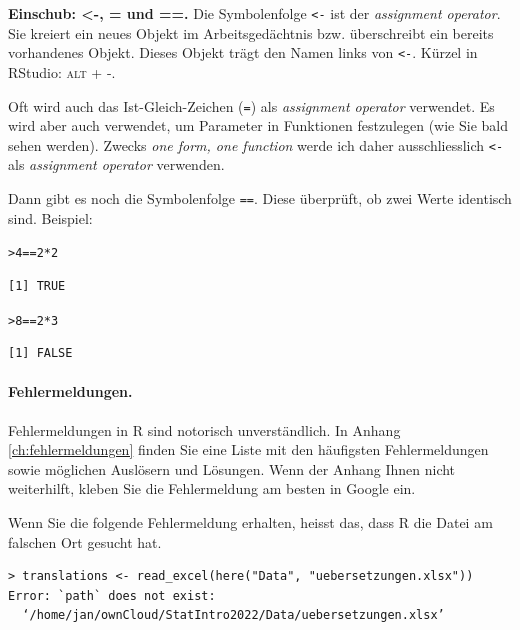 \documentclass[oneside, 10pt]{book}\usepackage[]{graphicx}\usepackage[]{xcolor}
\makeatletter
\newcommand{\hlnum}[1]{\textcolor[rgb]{0.686,0.059,0.569}{#1}}%
\newcommand{\hlopt}[1]{\textcolor[rgb]{0,0,0}{#1}}%
\newcommand{\hlstd}[1]{\textcolor[rgb]{0.345,0.345,0.345}{#1}}%
\newenvironment{kframe}{%
 \def\at@end@of@kframe{}%
 \ifinner\ifhmode%
  \def\at@end@of@kframe{\end{minipage}}%
  \begin{minipage}{\columnwidth}%
 \fi\fi%
 \def\FrameCommand##1{\hskip\@totalleftmargin \hskip-\fboxsep
 \colorbox{shadecolor}{##1}\hskip-\fboxsep
     \hskip-\linewidth \hskip-\@totalleftmargin \hskip\columnwidth}%
 \MakeFramed {\advance\hsize-\width
   \@totalleftmargin\z@ \linewidth\hsize
   \@setminipage}}%
 {\par\unskip\endMakeFramed%
 \at@end@of@kframe}
\newenvironment{knitrout}{}{} %
\makeatother
\begin{document}
\begin{framed}
\noindent \textbf{Einschub: <-, = und ==.}
Die Symbolenfolge \texttt{<-} ist der \textit{assignment operator}.
Sie kreiert ein neues Objekt im Arbeitsgedächtnis bzw. überschreibt ein bereits
vorhandenes Objekt. Dieses Objekt trägt den Namen links von \texttt{<-}.
Kürzel in RStudio: \textsc{alt} + \textsc{-}.

Oft wird auch das Ist-Gleich-Zeichen (\texttt{=}) als \textit{assignment operator} verwendet.
Es wird aber auch verwendet, um Parameter in Funktionen festzulegen (wie Sie
bald sehen werden). Zwecks \textit{one form, one function} werde ich daher
ausschliesslich \texttt{<-} als \textit{assignment operator} verwenden.

Dann gibt es noch die Symbolenfolge \texttt{==}. Diese überprüft,
ob zwei Werte identisch sind. Beispiel:

\begin{knitrout}
\color{fgcolor}\begin{kframe}
\begin{alltt}
\hlstd{> }\hlnum{4} \hlopt{==} \hlnum{2} \hlopt{*} \hlnum{2}
\end{alltt}
\begin{verbatim}
[1] TRUE
\end{verbatim}
\begin{alltt}
\hlstd{> }\hlnum{8} \hlopt{==} \hlnum{2} \hlopt{*} \hlnum{3}
\end{alltt}
\begin{verbatim}
[1] FALSE
\end{verbatim}
\end{kframe}
\end{knitrout}
\end{framed}

\paragraph{Fehlermeldungen.}
Fehlermeldungen in R sind notorisch unverständlich.
In Anhang \ref{ch:fehlermeldungen} finden Sie eine 
Liste mit den häufigsten Fehlermeldungen
sowie möglichen Auslösern und Lösungen. Wenn der Anhang Ihnen
nicht weiterhilft, kleben Sie die Fehlermeldung am besten in
Google ein.

Wenn Sie die folgende Fehlermeldung erhalten,
heisst das, dass R die Datei am falschen Ort gesucht hat.

\begin{verbatim}
> translations <- read_excel(here("Data", "uebersetzungen.xlsx"))
Error: `path` does not exist: 
  ‘/home/jan/ownCloud/StatIntro2022/Data/uebersetzungen.xlsx’
\end{verbatim}
\end{document}
